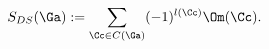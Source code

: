 \begin{equation}
S_{DS}(\Ga) := \sum_{\Cc \in C(\Ga)} (-1)^{l(\Cc)} \Om(\Cc).
\label{eq:ds-antip}%
\end{equation}


